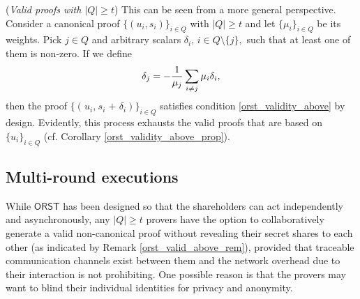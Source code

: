 \documentclass{iacrtrans}
\begin{document}
\begin{rem}\label{orst_valid_above_rem}
(\textit{Valid proofs with $|Q| \ge t$})
This can be seen from a more general perspective.
Consider a canonical proof $\{(u_i, s_i)\}_{i \in Q}$
with $|Q| \ge t$ and let $\{\mu_i\}_{i \in Q}$ be its weights.
Pick $j \in Q$ and arbitrary scalars
$\delta_i,\hspace{2pt} i \in Q \setminus \{j\},$
such that at least one of them is non-zero.
If we define
\vspace{5pt}
\begin{equation*}
\delta_j = - \frac{1}{\mu_j}
\sum_{i \neq j} \mu_i \delta_i,
\vspace{5pt}
\end{equation*}
then the proof $
	\{
		(
			\hspace{1pt}
			u_i,
			\hspace{1pt}
			s_i
			\hspace{1pt}
			+
			\hspace{1pt}
			\delta_i
		)
	\}_{i \in Q}$
satisfies condition \eqref{orst_validity_above}
by design. Evidently, this process exhausts the valid proofs
that are based on $\{u_i\}_{i \in Q}$
(cf. Corollary \ref{orst_validity_above_prop}).
\end{rem}

\subsection{Multi-round executions}\label{section_multi_round}

While $\mathsf{ORST}$ has been designed so that
the shareholders can act independently and asynchronously,
any $|Q| \ge t$ provers have the option to collaboratively
generate a valid non-canonical proof without
revealing their secret shares to each other
(as indicated by Remark \ref{orst_valid_above_rem}),
provided that traceable communication channels
exist between them and the network overhead
due to their interaction is not prohibiting.
One possible reason is that the provers
may want to blind their individual identities
for privacy and anonymity.
\end{document}
